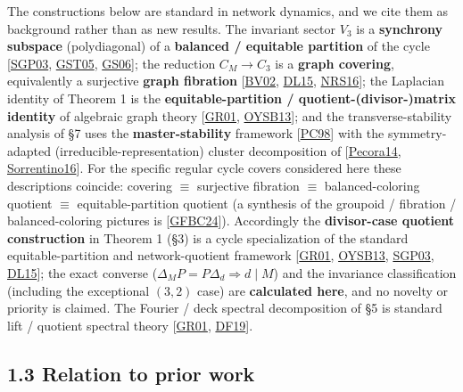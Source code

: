 \documentclass[
  11pt,
  a4paper,
]{article}
\begin{document}
The constructions below are standard in network dynamics, and we cite them as background rather than as new results. The invariant sector \(V_3\) is a \textbf{synchrony subspace} (polydiagonal) of a \textbf{balanced / equitable partition} of the cycle {[}\hyperlink{ref-SGP03}{SGP03}, \hyperlink{ref-GST05}{GST05}, \hyperlink{ref-GS06}{GS06}{]}; the reduction \(C_M\to C_3\) is a \textbf{graph covering}, equivalently a surjective \textbf{graph fibration} {[}\hyperlink{ref-BV02}{BV02}, \hyperlink{ref-DL15}{DL15}, \hyperlink{ref-NRS16}{NRS16}{]}; the Laplacian identity of Theorem 1 is the \textbf{equitable-partition / quotient-(divisor-)matrix identity} of algebraic graph theory {[}\hyperlink{ref-GR01}{GR01}, \hyperlink{ref-OYSB13}{OYSB13}{]}; and the transverse-stability analysis of §7 uses the \textbf{master-stability} framework {[}\hyperlink{ref-PC98}{PC98}{]} with the symmetry-adapted (irreducible-representation) cluster decomposition of {[}\hyperlink{ref-Pecora14}{Pecora14}, \hyperlink{ref-Sorrentino16}{Sorrentino16}{]}. For the specific regular cycle covers considered here these descriptions coincide: covering \(\equiv\) surjective fibration \(\equiv\) balanced-coloring quotient \(\equiv\) equitable-partition quotient (a synthesis of the groupoid / fibration / balanced-coloring pictures is {[}\hyperlink{ref-GFBC24}{GFBC24}{]}). Accordingly the \textbf{divisor-case quotient construction} in Theorem 1 (§3) is a cycle specialization of the standard equitable-partition and network-quotient framework {[}\hyperlink{ref-GR01}{GR01}, \hyperlink{ref-OYSB13}{OYSB13}, \hyperlink{ref-SGP03}{SGP03}, \hyperlink{ref-DL15}{DL15}{]}; the exact converse (\(\Delta_M P=P\Delta_d\Rightarrow d\mid M\)) and the invariance classification (including the exceptional \((3,2)\) case) are \textbf{calculated here}, and no novelty or priority is claimed. The Fourier / deck spectral decomposition of §5 is standard lift / quotient spectral theory {[}\hyperlink{ref-GR01}{GR01}, \hyperlink{ref-DF19}{DF19}{]}.

\subsection{1.3 Relation to prior work}\label{relation-to-prior-work}
\end{document}
